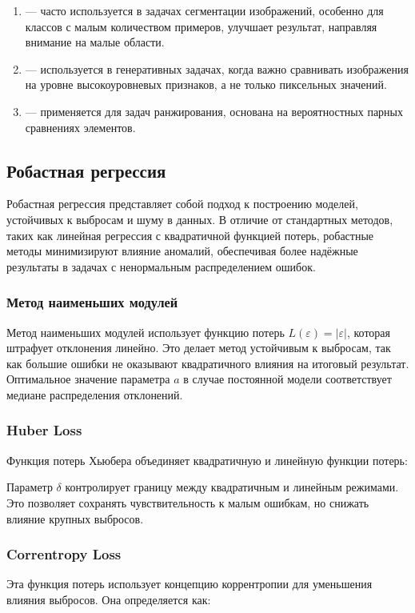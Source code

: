 \begin{enumerate}
    \item {} — часто используется в задачах сегментации изображений, особенно для классов с малым количеством примеров, улучшает результат, направляя внимание на малые области.

    \item {} — используется в генеративных задачах, когда важно сравнивать изображения на уровне высокоуровневых признаков, а не только пиксельных значений.

    \item {} — применяется для задач ранжирования, основана на вероятностных парных сравнениях элементов.
\end{enumerate}


\subsection*{Робастная регрессия}
Робастная регрессия представляет собой подход к построению моделей, устойчивых к выбросам и шуму в данных. В отличие от стандартных методов, таких как линейная регрессия с квадратичной функцией потерь, робастные методы минимизируют влияние аномалий, обеспечивая более надёжные результаты в задачах с ненормальным распределением ошибок.

\subsubsection*{Метод наименьших модулей}
Метод наименьших модулей использует функцию потерь $L(\varepsilon) = |\varepsilon|$, которая штрафует отклонения линейно. Это делает метод устойчивым к выбросам, так как большие ошибки не оказывают квадратичного влияния на итоговый результат. Оптимальное значение параметра $a$ в случае постоянной модели соответствует медиане распределения отклонений.

\subsubsection*{Huber Loss}
Функция потерь Хьюбера объединяет квадратичную и линейную функции потерь:

Параметр $\delta$ контролирует границу между квадратичным и линейным режимами. Это позволяет сохранять чувствительность к малым ошибкам, но снижать влияние крупных выбросов.

\subsubsection*{Correntropy Loss}
Эта функция потерь использует концепцию коррентропии для уменьшения влияния выбросов. Она определяется как:

